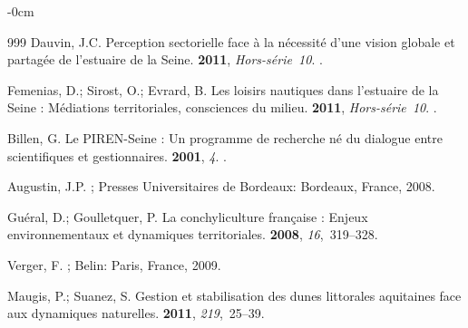 \documentclass[coasts,article,accept,pdftex,moreauthors]{Definitions/mdpi}
\begin{document}
\begin{adjustwidth}{-\extralength}{0cm}
\begin{thebibliography}{999}
Dauvin, J.C.
\newblock Perception sectorielle face à la nécessité d’une vision globale
  et partagée de l’estuaire de la Seine.
  {\bf 2011}, {\em Hors-série~10}.
.

Femenias, D.; Sirost, O.; Evrard, B.
\newblock Les loisirs nautiques dans l'estuaire de la Seine : Médiations
  territoriales, consciences du milieu.
  {\bf 2011}, {\em Hors-série~10}.
.

Billen, G.
\newblock Le PIREN-Seine : Un programme de recherche né du dialogue entre
  scientifiques et gestionnaires.
 {\bf 2001}, {\em 4}.
.

Augustin, J.P.
;
  Presses Universitaires de Bordeaux: Bordeaux, France,   2008.

Guéral, D.; Goulletquer, P.
\newblock La conchyliculture française : Enjeux environnementaux et dynamiques
  territoriales.
 {\bf 2008}, {\em 16},~319--328.

Verger, F.
; Belin: Paris, France,   2009.

Maugis, P.; Suanez, S.
\newblock Gestion et stabilisation des dunes littorales aquitaines face aux
  dynamiques naturelles.
 {\bf 2011}, {\em 219},~25--39.


\end{thebibliography}
\end{adjustwidth}
\end{document}
